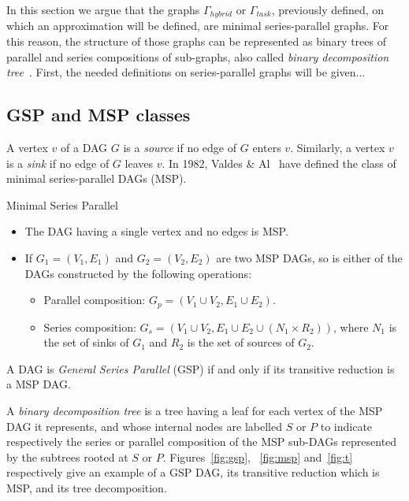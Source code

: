 In this section we argue that the graphs $\Gamma_{hybrid}$ or $\Gamma_{task}$, previously defined, on which an approximation will be defined, are minimal series-parallel graphs. For this reason, the structure of those graphs can be represented as binary trees of parallel and series compositions of sub-graphs, also called \emph{binary decomposition tree}~\cite{Valdes:1979:RSP:800135.804393}. First, the needed definitions on series-parallel graphs will be given...

\subsection{GSP and MSP classes}
A vertex $v$ of a DAG $G$ is a \emph{source} if no edge of $G$ enters $v$. Similarly, a vertex $v$ is a \emph{sink} if no edge of $G$ leaves $v$. In 1982, Valdes \& Al~\cite{Valdes:1979:RSP:800135.804393} have defined the class of minimal series-parallel DAGs (MSP).

\begin{mydef}Minimal Series Parallel
\begin{itemize}
\item The DAG having a single vertex and no edges is MSP.
\item If $G_1=(V_1,E_1)$ and $G_2=(V_2,E_2)$ are two MSP DAGs, so is either of the DAGs constructed by the following operations:
\begin{itemize}
\item Parallel composition: $G_p=(V_1\cup V_2,E_1\cup E_2)$.
\item Series composition: $G_s=(V_1\cup V_2,E_1\cup E_2\cup (N_1 \times R_2))$, where $N_1$ is the set of sinks of $G_1$ and $R_2$ is the set of sources of $G_2$.
\end{itemize}
\end{itemize}
\end{mydef}

\begin{mydef}
A DAG is \emph{General Series Parallel} (GSP) if and only if its transitive reduction is a MSP DAG.
\end{mydef}

A \emph{binary decomposition tree} is a tree having a leaf for each vertex of the MSP DAG it represents, and whose internal nodes are labelled $S$ or $P$ to indicate respectively the series or parallel composition of the MSP sub-DAGs represented by the subtrees rooted at $S$ or $P$. Figures~\ref{fig:gsp}, ~\ref{fig:msp} and~\ref{fig:t} respectively give an example of a GSP DAG, its transitive reduction which is MSP, and its tree decomposition.

